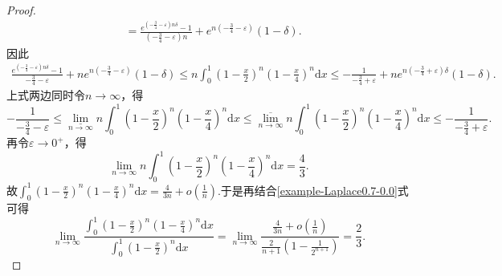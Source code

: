 \documentclass[../../main.tex]{subfiles}
\begin{document}
\begin{proof}
\begin{align*}
&=\frac{e^{\left( -\frac{3}{4}-\varepsilon \right) n\delta}-1}{\left( -\frac{3}{4}-\varepsilon \right) n}+e^{n\left( -\frac{3}{4}-\varepsilon \right)}\left( 1-\delta \right) .
\end{align*}
因此
\begin{align*}
\frac{e^{\left( -\frac{3}{4}-\varepsilon \right) n\delta}-1}{-\frac{3}{4}-\varepsilon}+ne^{n\left( -\frac{3}{4}-\varepsilon \right)}\left( 1-\delta \right) \leqslant n\int_0^1{\left( 1-\frac{x}{2} \right) ^n\left( 1-\frac{x}{4} \right) ^n\mathrm{d}x}\leqslant -\frac{1}{-\frac{3}{4}+\varepsilon}+ne^{n\left( -\frac{3}{4}+\varepsilon \right) \delta}\left( 1-\delta \right) .
\end{align*}
上式两边同时令$n\rightarrow \infty$，得
\[
-\frac{1}{-\frac{3}{4}-\varepsilon}\leqslant \underset{n\rightarrow \infty}{\underline{\lim }}n\int_0^1{\left( 1-\frac{x}{2} \right) ^n\left( 1-\frac{x}{4} \right) ^n\mathrm{d}x}\leqslant \underset{n\rightarrow \infty}{\overline{\lim }}n\int_0^1{\left( 1-\frac{x}{2} \right) ^n\left( 1-\frac{x}{4} \right) ^n\mathrm{d}x}\leqslant -\frac{1}{-\frac{3}{4}+\varepsilon}.
\]
再令$\varepsilon \rightarrow 0^+$，得
\[
\lim\limits_{n\rightarrow \infty}n\int_0^1{\left( 1-\frac{x}{2} \right) ^n\left( 1-\frac{x}{4} \right) ^n\mathrm{d}x}=\frac{4}{3}.
\]
故$\int_0^1{\left( 1-\frac{x}{2} \right) ^n\left( 1-\frac{x}{4} \right) ^n\mathrm{d}x}=\frac{4}{3n}+o\left( \frac{1}{n} \right) .$于是再结合\eqref{example-Laplace0.7-0.0}式可得
\[
\lim_{n\rightarrow \infty} \frac{\int_0^1{\left( 1-\frac{x}{2} \right) ^n\left( 1-\frac{x}{4} \right) ^n\mathrm{d}x}}{\int_0^1{\left( 1-\frac{x}{2} \right) ^n\mathrm{d}x}}=\lim_{n\rightarrow \infty} \frac{\frac{4}{3n}+o\left( \frac{1}{n} \right)}{\frac{2}{n+1}\left( 1-\frac{1}{2^{n+1}} \right)}=\frac{2}{3}.
\]

\end{proof}
\end{document}
